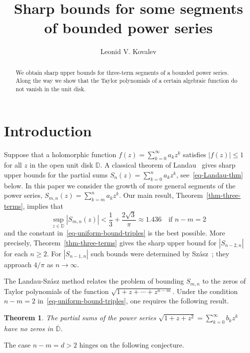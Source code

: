 \documentclass[12pt]{amsart}
\title[Segments of bounded power series]{Sharp bounds for some segments \\ of bounded power series}
\author{Leonid V. Kovalev}
\newtheorem{theorem}{Theorem}[section]
\theoremstyle{definition}
\theoremstyle{remark}
\numberwithin{equation}{section}
\begin{document}
\baselineskip6.5mm

\begin{abstract} We obtain sharp upper bounds for three-term segments of a bounded power series. Along the way we show that the Taylor polynomials of a certain algebraic function do not vanish in the unit disk.  
\end{abstract}

\maketitle

\section{Introduction}\label{sec-introduction} 

Suppose that a holomorphic function $f(z)=\sum_{k=0}^\infty a_k z^k$ satisfies $|f(z)|\le 1$ for all $z$ in the open unit disk $\mathbb D$. A classical theorem of 
Landau~\cite{Landau} gives sharp upper bounds for the partial sums $S_n(z)= \sum_{k=0}^n a_k z^k$, see~\eqref{eq-Landau-thm} below. In this paper we consider the growth of more general segments of the power series, $S_{m, n}(z)=\sum_{k=m}^n a_k z^k$. Our main result, Theorem~\ref{thm-three-terms}, implies that 
\begin{equation}\label{eq-uniform-bound-triples}
\sup_{z\in \mathbb D} |S_{m, n}(z)| < \frac{1}{3} + \frac{2\sqrt{3}}{\pi} \approx 1.436  \quad \text{if } n-m = 2   
\end{equation}
and the constant in~\eqref{eq-uniform-bound-triples} is the best possible. More precisely, Theorem~\ref{thm-three-terms} gives the sharp upper bound for $|S_{n-2, n}|$ for each $n\ge 2$. For $|S_{n-1, n}|$ such bounds were determined by Sz\'{a}sz~\cite{Szasz1918}; they approach $4/\pi$ as $n\to\infty$.   

The Landau-Sz\'{a}sz method relates the problem of bounding $S_{m, n}$ to the zeros of Taylor polynomials of the function $\sqrt{1+z+\cdots +z^{n-m}}$. Under the condition $n-m=2$ in~\eqref{eq-uniform-bound-triples}, one requires the following result. 

\begin{theorem}\label{thm-no-zeros} The partial sums of the power series $\sqrt{1+z+z^2} = \sum_{k=0}^\infty b_k z^k$ have no zeros in $\overline{\mathbb D}$. 
\end{theorem}

The case $n-m=d>2$ hinges on the following conjecture. 
\end{document}
